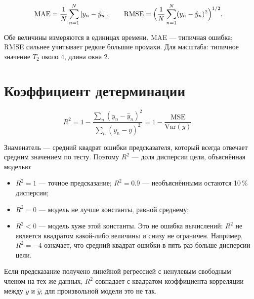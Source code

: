 \documentclass[12pt,a4paper]{report}
\numberwithin{equation}{chapter}
\begin{document}
\begin{keybox}
\begin{equation}
\mathrm{MAE}=\frac1N\sum_{n=1}^N|y_n-\hat y_n|,\qquad
\mathrm{RMSE}=\Bigl(\frac1N\sum_{n=1}^N(y_n-\hat y_n)^2\Bigr)^{1/2}.
\end{equation}
\end{keybox}
Обе величины измеряются в единицах времени. MAE --- типичная ошибка; RMSE
сильнее учитывает редкие большие промахи. Для масштаба: типичное значение
$T_2$ около $4$, длина окна $2$.

\section{Коэффициент детерминации}
\label{sec:r2}

\begin{keybox}
\begin{equation}
R^2=1-\frac{\sum_n(y_n-\hat y_n)^2}{\sum_n(y_n-\bar y)^2}
=1-\frac{\mathrm{MSE}}{\mathrm{Var}(y)} .
\label{eq:R2}
\end{equation}
\end{keybox}
Знаменатель --- средний квадрат ошибки предсказателя, который всегда отвечает
средним значением по тесту. Поэтому $R^2$ --- доля дисперсии цели, объяснённая
моделью:
\begin{itemize}
\item $R^2=1$ --- точное предсказание; $R^2=0.9$ --- необъяснёнными остаются
      10\,\% дисперсии;
\item $R^2=0$ --- модель не лучше константы, равной среднему;
\item $R^2<0$ --- модель хуже этой константы. Это не ошибка вычислений:
      $R^2$ не является квадратом какой-либо величины и снизу не ограничен.
      Например, $R^2=-4$ означает, что средний квадрат ошибки в пять раз
      больше дисперсии цели.
\end{itemize}
Если предсказание получено линейной регрессией с ненулевым свободным членом на
тех же данных, $R^2$ совпадает с квадратом коэффициента корреляции между
$y$ и $\hat y$; для произвольной модели это не так.
\end{document}
